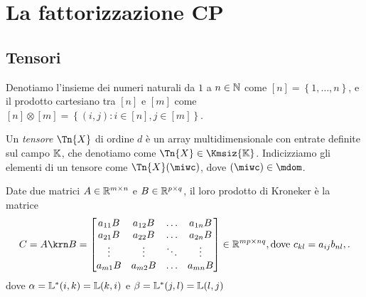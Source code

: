 \chapter{La fattorizzazione CP}


\section{Tensori}

\begin{definition}
  Denotiamo l'insieme dei numeri naturali da $ 1 $ a $ n \in \mathbb{N} $ come $ [n] = \left\{ 1,\dots,n
  \right\} $, e il prodotto cartesiano tra $ [n] $ e $ [m] $ come $ [n] \otimes [m] =
  \left\{ (i,j) : i \in [n], j \in [m] \right\} $.
\end{definition}

\begin{definition}
  Un \emph{tensore} $ \Tn{X}  $ di ordine $ d $ è un array multidimensionale con entrate definite sul campo $
  \mathbb{K} $, che denotiamo come $  \Tn{X} \in \Kmsiz{\K} $. Indicizziamo gli elementi di un tensore come
  $ \Tn{X}(\miwc) $, dove $ (\miwc) \in \mdom$.
\end{definition}





\begin{definition}
  Date due matrici $ A \in \mathbb{R}^{m \times n} $ e $ B \in \mathbb{R}^{p \times q} $, il loro prodotto
  di Kroneker è la matrice 
  \[
  C = A \krn B = 
  \begin{bmatrix} 
    a_{11}B & a_{12}B & \ldots & a_{1n}B \\ 
    a_{21}B & a_{22}B & \ldots & a_{2n}B \\ 
    \vdots & \vdots & \ddots & \vdots \\ 
    a_{m1}B & a_{m2}B & \ldots & a_{mn}B \\ 
  \end{bmatrix}  \in  \R^{mp \times nq}, \text{dove } c_{kl} = a_{ij}b_{nl},
  .\] 
  dove $ \alpha = \mathbb{L}^*(i,k) = \mathbb{L}(k,i) $ e $ \beta = \mathbb{L}^*(j,l) = \mathbb{L}(l,j) $
  
\end{definition}

